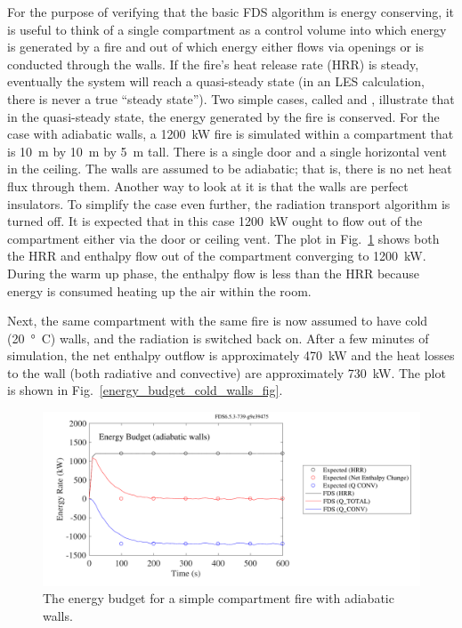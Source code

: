 \documentclass[11pt]{book}
\begin{document}
For the purpose of verifying that the basic FDS algorithm is energy conserving, it is useful to think of a single compartment as a control volume into which energy is generated by a fire and out of which energy either flows via openings or is conducted through the walls. If the fire's heat release rate (HRR) is steady, eventually the system will reach a quasi-steady state (in an LES calculation, there is never a true ``steady state''). Two simple cases, called  and , illustrate that in the quasi-steady state, the energy generated by the fire is conserved. For the case with adiabatic walls, a 1200~kW fire is simulated within a compartment that is 10~m by 10~m by 5~m tall. There is a single door and a single horizontal vent in the ceiling. The walls are assumed to be adiabatic; that is, there is no net heat flux through them. Another way to look at it is that the walls are perfect insulators. To simplify the case even further, the radiation transport algorithm is turned off. It is expected that in this case 1200~kW ought to flow out of the compartment either via the door or ceiling vent. The plot in Fig.~\ref{energy_budget_adiabatic_walls_fig} shows both the HRR and enthalpy flow out of the compartment converging to 1200~kW. During the warm up phase, the enthalpy flow is less than the HRR because energy is consumed heating up the air within the room.

Next, the same compartment with the same fire is now assumed to have cold (20~\si{\degree C}) walls, and the radiation is switched back on. After a few minutes of simulation, the net enthalpy outflow is approximately 470~kW and the heat losses to the wall (both radiative and convective) are approximately 730~kW. The plot is shown in Fig.~\ref{energy_budget_cold_walls_fig}.

\begin{figure}[ht]
\centering
\includegraphics[width=.8\textwidth]{SCRIPT_FIGURES/energy_budget_adiabatic_walls}
\caption[The {\ct energy\_budget\_adiabatic\_walls} test case]{The energy budget for a simple compartment fire with adiabatic walls.}
\label{energy_budget_adiabatic_walls_fig}
\end{figure}
\end{document}
